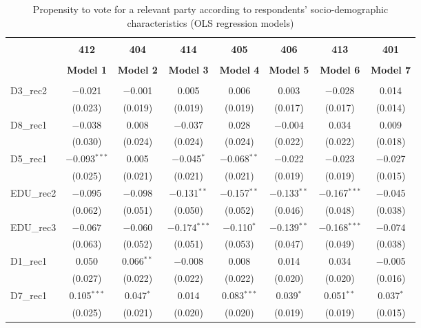 \documentclass[
]{article}
\begin{document}
\begin{table}[!htbp] \centering 
  \caption{Propensity to vote for a relevant party according to respondents' 
                     socio-demographic characteristics (OLS regression models)} 
  \label{table:full_ols_hr} 
\begin{tabular}{@{\extracolsep{5pt}}lccccccc} 
\\[-1.8ex]\hline \\[-1.8ex] 
 & \textbf{412} & \textbf{404} & \textbf{414} & \textbf{405} & \textbf{406} & \textbf{413} & \textbf{401} \\ 
\\[-1.8ex] & \textbf{Model 1} & \textbf{Model 2} & \textbf{Model 3} & \textbf{Model 4} & \textbf{Model 5} & \textbf{Model 6} & \textbf{Model 7}\\ 
\hline \\[-1.8ex] 
 D3\_rec2 & $-$0.021 & $-$0.001 & 0.005 & 0.006 & 0.003 & $-$0.028 & 0.014 \\ 
  & (0.023) & (0.019) & (0.019) & (0.019) & (0.017) & (0.017) & (0.014) \\ 
  D8\_rec1 & $-$0.038 & 0.008 & $-$0.037 & 0.028 & $-$0.004 & 0.034 & 0.009 \\ 
  & (0.030) & (0.024) & (0.024) & (0.024) & (0.022) & (0.022) & (0.018) \\ 
  D5\_rec1 & $-$0.093$^{***}$ & 0.005 & $-$0.045$^{*}$ & $-$0.068$^{**}$ & $-$0.022 & $-$0.023 & $-$0.027 \\ 
  & (0.025) & (0.021) & (0.021) & (0.021) & (0.019) & (0.019) & (0.015) \\ 
  EDU\_rec2 & $-$0.095 & $-$0.098 & $-$0.131$^{**}$ & $-$0.157$^{**}$ & $-$0.133$^{**}$ & $-$0.167$^{***}$ & $-$0.045 \\ 
  & (0.062) & (0.051) & (0.050) & (0.052) & (0.046) & (0.048) & (0.038) \\ 
  EDU\_rec3 & $-$0.067 & $-$0.060 & $-$0.174$^{***}$ & $-$0.110$^{*}$ & $-$0.139$^{**}$ & $-$0.168$^{***}$ & $-$0.074 \\ 
  & (0.063) & (0.052) & (0.051) & (0.053) & (0.047) & (0.049) & (0.038) \\ 
  D1\_rec1 & 0.050 & 0.066$^{**}$ & $-$0.008 & 0.008 & 0.014 & 0.034 & $-$0.005 \\ 
  & (0.027) & (0.022) & (0.022) & (0.022) & (0.020) & (0.020) & (0.016) \\ 
  D7\_rec1 & 0.105$^{***}$ & 0.047$^{*}$ & 0.014 & 0.083$^{***}$ & 0.039$^{*}$ & 0.051$^{**}$ & 0.037$^{*}$ \\ 
  & (0.025) & (0.021) & (0.020) & (0.020) & (0.019) & (0.019) & (0.015) \\ 

\end{tabular}
\end{table}
\end{document}
